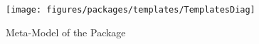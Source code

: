 %
%

\begin{figure}[htb]
  \centering
  \texttt{[image: figures/packages/templates/TemplatesDiag]}
  \caption{Meta-Model of the  Package}
  \label{fig:MM:templates}
\end{figure}
